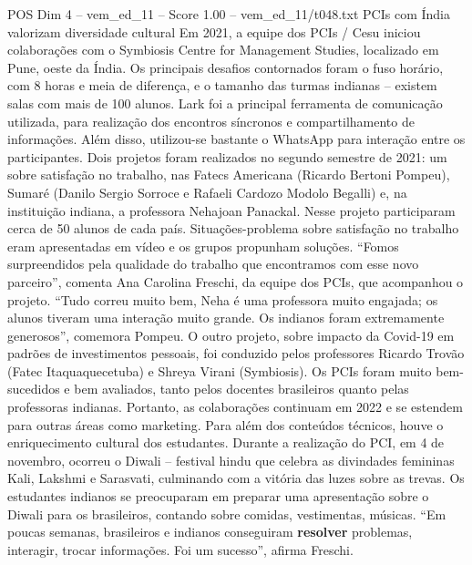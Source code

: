 \begin{textsample}{POS Dim 4 – vem\_ed\_11 – Score 1.00 – vem\_ed\_11/t048.txt}  \label{ex:f4_pos_167}
PCIs com Índia valorizam diversidade cultural Em 2021, a equipe dos PCIs / Cesu iniciou colaborações com o Symbiosis Centre for Management Studies, localizado em Pune, oeste da Índia.
Os principais desafios contornados foram o fuso horário, com 8 horas e meia de diferença, e o tamanho das turmas indianas – existem salas com mais de 100 alunos.
Lark foi a principal ferramenta de comunicação utilizada, para realização dos encontros síncronos e compartilhamento de informações.
Além disso, utilizou-se bastante o WhatsApp para interação entre os participantes.
Dois projetos foram realizados no segundo semestre de 2021: um sobre satisfação no trabalho, nas Fatecs Americana (Ricardo Bertoni Pompeu), Sumaré (Danilo Sergio Sorroce e Rafaeli Cardozo Modolo Begalli) e, na instituição indiana, a professora Nehajoan Panackal.
Nesse projeto participaram cerca de 50 alunos de cada país.
Situações-problema sobre satisfação no trabalho eram apresentadas em vídeo e os grupos propunham soluções. “Fomos surpreendidos pela qualidade do trabalho que encontramos com esse novo parceiro”, comenta Ana Carolina Freschi, da equipe dos PCIs, que acompanhou o projeto. “Tudo correu muito bem, Neha é uma professora muito engajada; os alunos tiveram uma interação muito grande.
Os indianos foram extremamente generosos”, comemora Pompeu.
O outro projeto, sobre impacto da Covid-19 em padrões de investimentos pessoais, foi conduzido pelos professores Ricardo Trovão (Fatec Itaquaquecetuba) e Shreya Virani (Symbiosis).
Os PCIs foram muito bem-sucedidos e bem avaliados, tanto pelos docentes brasileiros quanto pelas professoras indianas.
Portanto, as colaborações continuam em 2022 e se estendem para outras áreas como marketing.
Para além dos conteúdos técnicos, houve o enriquecimento cultural dos estudantes.
Durante a realização do PCI, em 4 de novembro, ocorreu o Diwali – festival hindu que celebra as divindades femininas Kali, Lakshmi e Sarasvati, culminando com a vitória das luzes sobre as trevas.
Os estudantes indianos se preocuparam em preparar uma apresentação sobre o Diwali para os brasileiros, contando sobre comidas, vestimentas, músicas. “Em poucas semanas, brasileiros e indianos conseguiram \textbf{resolver} problemas, interagir, trocar informações.
Foi um sucesso”, afirma Freschi.

\end{textsample}
